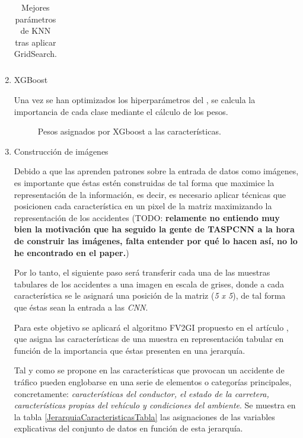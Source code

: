 \begin{enumerate}
\begin{table}[H]
\begin{tabular}{ |c|c| }
                    \end{tabular}
                \caption{Mejores parámetros de KNN tras aplicar GridSearch.}
                \label{BestGASolutionTable}
            \end{table}


        \item XGBoost


            Una vez se han optimizados los hiperparámetros del , se calcula la importancia de cada clase mediante el cálculo de los pesos.


            \begin{figure}[H]
                \centering
                
                \caption{Pesos asignados por XGboost a las características.}
                \label{FeatureWeightsImage}
             \end{figure}

        \item Construcción de imágenes


            Debido a que las  aprenden patrones sobre la entrada de datos como imágenes, es importante que éstas estén construidas de tal forma que maximice la representación de la información, es decir, es necesario aplicar técnicas que posicionen cada característica en un pixel de la matriz maximizando la representación de los accidentes (TODO: \textbf{relamente no entiendo muy bien la motivación que ha seguido la gente de TASPCNN a la hora de construir las imágenes, falta entender por qué lo hacen así, no lo he encontrado en el paper.})

            Por lo tanto, el siguiente paso será transferir cada una de las muestras tabulares de los accidentes a una imagen en escala de grises, donde a cada característica se le asignará una posición de la matriz (\textit{5 x 5}), de tal forma que éstas sean la entrada a las \textit{CNN}.

            Para este objetivo se aplicará el algoritmo FV2GI propuesto en el artículo \cite{TASPCNN}, que asigna las características de una muestra en representación tabular en función de la importancia que éstas presenten en una jerarquía.

            Tal y como se propone en \cite{JerarquiaImagenes} las características que provocan un accidente de tráfico pueden englobarse en una serie de elementos o categorías principales, concretamente: \textit{características del conductor, el estado de la carretera, características propias del vehículo y condiciones del ambiente}. Se muestra en la tabla \ref{JerarquiaCaracteristicasTabla} las asignaciones de las variables explicativas del conjunto de datos en función de esta jerarquía.



\end{enumerate}
